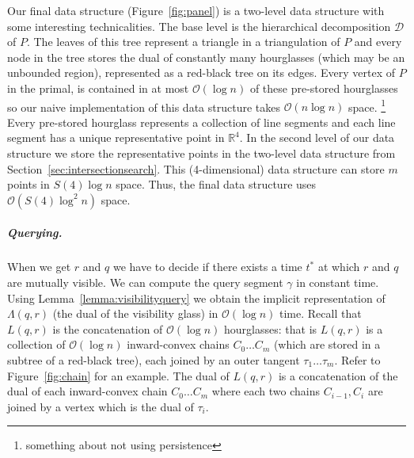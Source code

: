 \documentclass[UKenglish]{lipics-v2019}
\begin{document}
Our final data structure (Figure~\ref{fig:panel}) is a two-level data structure with some interesting technicalities. The base level is the hierarchical decomposition $\mathcal{D}$ of $P$. The leaves of this tree represent a triangle in a triangulation of $P$ and every node in the tree stores the dual of constantly many hourglasses (which may be an unbounded region), represented as a red-black tree on its edges. Every vertex of $P$ in the primal, is contained in at most $\mathcal{O}(\log n)$ of these pre-stored hourglasses \cite{FRANK} so our naive implementation of this data structure takes $\mathcal{O}(n \log n)$ space. \footnote{something about not using persistence}
Every pre-stored hourglass represents a collection of line segments and each line segment has a unique representative point in $\mathbb{R}^4$. In the second level of our data structure we store the representative points in the two-level data structure from Section~\ref{sec:intersectionsearch}. This (4-dimensional) data structure can store $m$ points in $S(4) \log n$ space. Thus, the final data structure uses $\mathcal{O}(S(4) \log^2 n)$ space.

\subparagraph{Querying.}
When we get $r$ and $q$ we have to decide if there exists
a time $t^*$ at which $r$ and $q$ are mutually visible. We can compute the query segment $\gamma$ in constant time. Using Lemma~\ref{lemma:visibilityquery} we obtain the implicit representation of $\Lambda(q,r)$ (the dual of the visibility glass) in $\mathcal{O}(\log n)$ time. Recall that $L(q,r)$ is the concatenation of $\mathcal{O}(\log n)$ hourglasses: that is $L(q,r)$ is a collection of $\mathcal{O}(\log n)$ inward-convex chains $C_0 \ldots C_m$ (which are stored in a subtree of a red-black tree), each joined by an outer tangent $\tau_1 \ldots \tau_{m}$. Refer to Figure~\ref{fig:chain} for an example. The dual of $L(q,r)$ is a concatenation of the dual of each inward-convex chain $C_0 \ldots C_m$ where each two chains $C_{i-1}, C_{i}$ are joined by a vertex which is the dual of $\tau_i$. 
\end{document}
